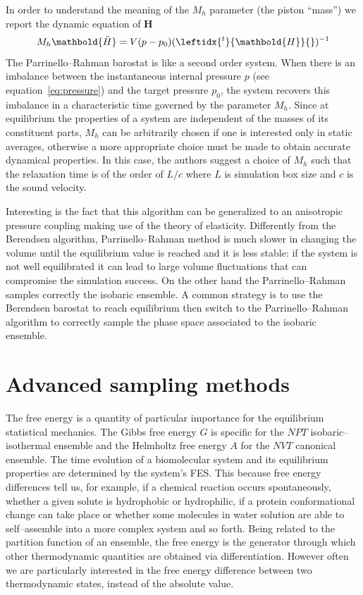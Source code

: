 In order to understand the meaning of the $M_h$ parameter (the piston ``mass'') we report the dynamic equation of 
$\mathbold H$
\begin{equation*}
	M_h \mathbold{\ddot H} = V (p - p_0) (\leftidx{^t}{\mathbold{H}}{})^{-1}
\end{equation*}
The Parrinello--Rahman barostat is like a second order system. When there is an imbalance between the
instantaneous internal pressure $p$ (see equation~\eqref{eq:pressure}) and the target pressure $p_0$, the system
recovers this imbalance in a characteristic time governed by the parameter $M_h$. Since at equilibrium the
properties of a system are independent of the masses of its constituent parts, $M_h$ can be arbitrarily chosen if
one is interested only in static averages, otherwise a more appropriate choice must be made to obtain accurate
dynamical properties. In this case, the authors suggest a choice of $M_h$ such that the relaxation time is of the
order of $L/c$ where $L$ is simulation box size and $c$ is the sound velocity.

Interesting is the fact that this algorithm can be generalized to an anisotropic pressure coupling making use of
the theory of elasticity. Differently from the Berendsen algorithm, Parrinello--Rahman method is much slower in
changing the volume until the equilibrium value is reached and it is less stable: if the system is not well
equilibrated it can lead to large volume fluctuations that can compromise the simulation success. On the other hand
the Parrinello--Rahman samples correctly the isobaric ensemble. A common strategy is to use the Berendsen
barostat to reach equilibrium then switch to the Parrinello--Rahman algorithm to correctly sample the phase space
associated to the isobaric ensemble.

\newpage
\section{Advanced sampling methods}
The free energy is a quantity of particular importance for the equilibrium statistical mechanics. The 
Gibbs free energy $G$ is specific for the $NPT$ isobaric--isothermal ensemble and the Helmholtz free energy $A$ 
for the $NVT$ canonical ensemble. The time evolution of a biomolecular system and its equilibrium properties are 
determined by the system's \ac{FES}. This because free energy differences tell us, for example, if a chemical 
reaction occurs spontaneously, whether a given solute is hydrophobic or hydrophilic, if a protein conformational 
change can take place or whether some molecules in water solution are able to self--assemble into a more complex 
system and so forth. Being related to the partition function of an ensemble, the free energy is the generator 
through which other thermodynamic quantities are obtained via differentiation. However often we are particularly 
interested in the free energy difference between two thermodynamic states, instead of the absolute value. 

